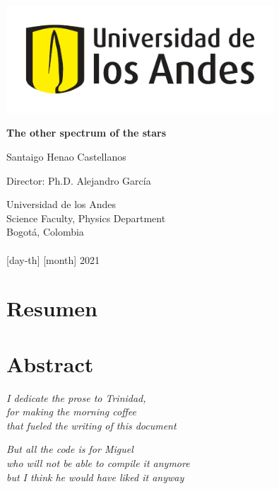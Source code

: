 \documentclass[12pt,letterpaper,oneside]{book}
\begin{document}
	\begin{titlepage}
	\begin{center}
		\includegraphics[width=10cm]{img/logo-uniandes.pdf}
		
		\vspace{2cm}
		
		{\fontsize{30}{45}\selectfont \bf The other spectrum of the stars\par}
		
		\vspace{10mm}
		
		
		{\huge Santaigo Henao Castellanos}
		
		\vspace{10mm}
		
		{\huge Director: Ph.D. Alejandro García } 
		
		\vspace{15mm}
		
		{\Large
		Universidad de los Andes\\
		Science Faculty, Physics Department\\
		Bogotá, Colombia\\ \phantom{} \\
		{[day-th]} {[month]} 2021}
	\end{center}
	\end{titlepage}

\frontmatter

\chapter*{Resumen}

\chapter*{Abstract}

\newpage

\begin{flushright}
	\textit{
		I dedicate the prose to Trinidad,        \\
		for making the morning coffee            \\ 
		that fueled the writing of this document
	}
	
	\vspace{5mm}
	
	\textit{
		But all the code is for Miguel             \\
		who will not be able to compile it anymore \\ 
		but I think he would have liked it anyway
	}

\end{flushright}
\end{document}
